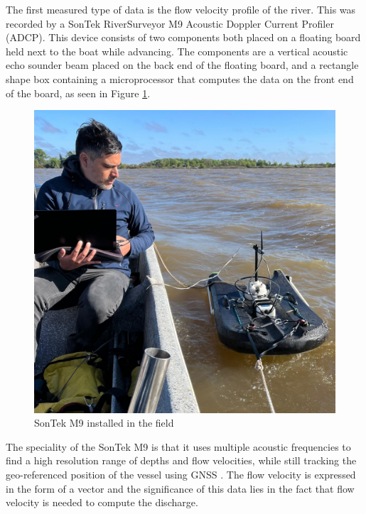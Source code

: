 

The first measured type of data is the flow velocity profile of the river. This was recorded by a SonTek RiverSurveyor M9 Acoustic Doppler Current Profiler (ADCP). This device consists of two components both placed on a floating board held next to the boat while advancing. The components are a vertical acoustic echo sounder beam placed on the back end of the floating board, and a rectangle shape box containing a microprocessor that computes the data on the front end of the board, as seen in Figure \ref{fig:SonTekmeasurement}.

\begin{figure}[H]
    \centering
    \includegraphics[width=0.5\linewidth]{figures/ch4/sonteknico.jpg}
    \caption{SonTek M9 installed in the field}
    \label{fig:SonTekmeasurement}
\end{figure}

The speciality of the SonTek M9 is that it uses multiple acoustic frequencies to find a high resolution range of depths and flow velocities, while still tracking the geo-referenced position of the vessel using GNSS \autocite{xylemSonTekM9}. The flow velocity is expressed in the form of a vector and the significance of this data lies in the fact that flow velocity is needed to compute the discharge. 

